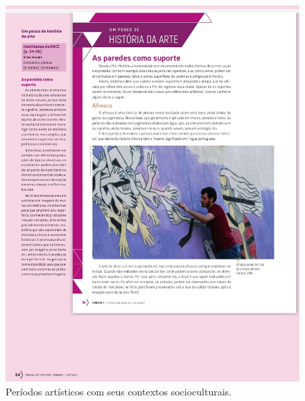 \documentclass[portuguese]{textolivre}
\begin{document}
\begin{figure}[h!]
 \centering
 \begin{minipage}{.9\textwidth}
 \begin{minipage}{.45\textwidth}
 \includegraphics[width=\textwidth]{Imagem5.jpeg}
 \caption{Períodos artísticos com seus contextos socioculturais.}
 \label{fig5}
 \end{minipage}%
 \qquad
 \begin{minipage}{0.45\textwidth}

\end{minipage}
\end{minipage}
\end{figure}
\end{document}
